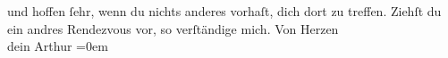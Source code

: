 \begin{ledgroupsized}[t]{13cm}
               und hoffen ſehr, wenn du nichts anderes vorhaſt, dich dort zu treffen.\pend
           \pstart
           Ziehſt du ein andres Rendezvous vor, so verſtändige mich.\pend
           \pstart
           Von Herzen{\\[\baselineskip]}dein \spacefill\mbox{Arthur}\pend
           \leftskip=0em{}\endnumbering{}\end{ledgroupsized}  \newcommand{\dateiname}{L01427}\newcommand{\titel}{Arthur Schnitzler an Hermann Bahr, 17. 8. 1904}\newcommand{\editorInnen}{ Kurt Ifkovits,  Martin Anton Müller}
      